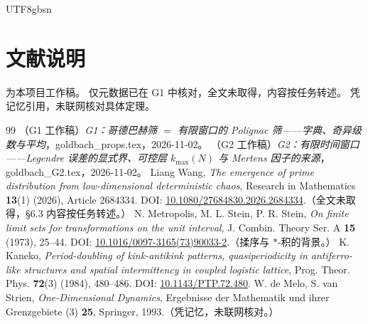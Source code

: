 \documentclass[11pt,a4paper]{article}
\theoremstyle{plain}
\theoremstyle{definition}
\begin{document}
\begin{CJK}{UTF8}{gbsn}
\section*{文献说明}
\cite{G1,G2} 为本项目工作稿。\cite{Wang26} 仅元数据已在 G1 中核对，全文未取得，内容按任务转述。
\cite{dMvS93} 凭记忆引用，未联网核对具体定理。

\begin{thebibliography}{99}
 （G1 工作稿）\emph{G1：哥德巴赫筛 $=$ 有限窗口的 Polignac 筛——字典、奇异级数与平均}，goldbach\_props.tex，2026-11-02。
 （G2 工作稿）\emph{G2：有限时间窗口——Legendre 误差的显式界、可控层 $k_{\max}(N)$ 与 Mertens 因子的来源}，goldbach\_G2.tex，2026-11-02。
 Liang Wang, \emph{The emergence of prime distribution from low-dimensional deterministic chaos},
Research in Mathematics \textbf{13}(1) (2026), Article 2684334. DOI: \url{10.1080/27684830.2026.2684334}.（全文未取得，\S6.3 内容按任务转述。）
 N. Metropolis, M. L. Stein, P. R. Stein, \emph{On finite limit sets for transformations on the unit interval},
J. Combin. Theory Ser. A \textbf{15} (1973), 25--44. DOI: \url{10.1016/0097-3165(73)90033-2}.（揉序与 $*$-积的背景。）
 K. Kaneko, \emph{Period-doubling of kink-antikink patterns, quasiperiodicity in antiferro-like structures and spatial intermittency in coupled logistic lattice},
Prog. Theor. Phys. \textbf{72}(3) (1984), 480--486. DOI: \url{10.1143/PTP.72.480}.
 W. de Melo, S. van Strien, \emph{One-Dimensional Dynamics}, Ergebnisse der Mathematik und ihrer Grenzgebiete (3) \textbf{25}, Springer, 1993.（凭记忆，未联网核对。）
\end{thebibliography}

\end{CJK}
\end{document}
